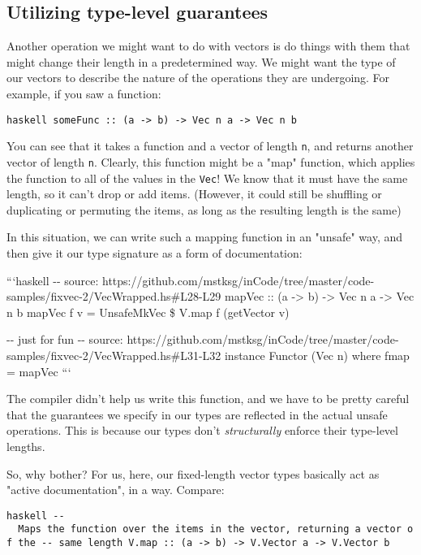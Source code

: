 \documentclass[]{article}
\begin{document}
\subsection{Utilizing type-level guarantees}

Another operation we might want to do with vectors is do things with them that
might change their length in a predetermined way. We might want the type of our
vectors to describe the nature of the operations they are undergoing. For
example, if you saw a function:

\texttt{haskell\ someFunc\ ::\ (a\ -\textgreater{}\ b)\ -\textgreater{}\ Vec\ n\ a\ -\textgreater{}\ Vec\ n\ b}

You can see that it takes a function and a vector of length \texttt{n}, and
returns another vector of length \texttt{n}. Clearly, this function might be a
"map" function, which applies the function to all of the values in the
\texttt{Vec}! We know that it must have the same length, so it can't drop or add
items. (However, it could still be shuffling or duplicating or permuting the
items, as long as the resulting length is the same)

In this situation, we can write such a mapping function in an "unsafe" way, and
then give it our type signature as a form of documentation:

```haskell -\/- source:
https://github.com/mstksg/inCode/tree/master/code-samples/fixvec-2/VecWrapped.hs\#L28-L29
mapVec :: (a -\textgreater{} b) -\textgreater{} Vec n a -\textgreater{} Vec n b
mapVec f v = UnsafeMkVec \$ V.map f (getVector v)

-\/- just for fun -\/- source:
https://github.com/mstksg/inCode/tree/master/code-samples/fixvec-2/VecWrapped.hs\#L31-L32
instance Functor (Vec n) where fmap = mapVec ```

The compiler didn't help us write this function, and we have to be pretty
careful that the guarantees we specify in our types are reflected in the actual
unsafe operations. This is because our types don't \emph{structurally} enforce
their type-level lengths.

So, why bother? For us, here, our fixed-length vector types basically act as
"active documentation", in a way. Compare:

\texttt{haskell\ -\/-\ \textbar{}\ Maps\ the\ function\ over\ the\ items\ in\ the\ vector,\ returning\ a\ vector\ of\ the\ -\/-\ same\ length\ V.map\ ::\ (a\ -\textgreater{}\ b)\ -\textgreater{}\ V.Vector\ a\ -\textgreater{}\ V.Vector\ b}
\end{document}
